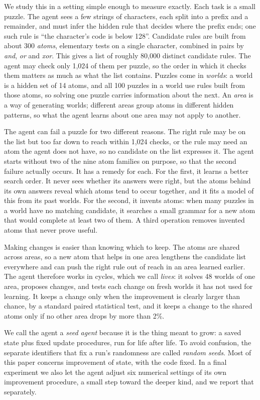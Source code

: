 \documentclass[11pt]{article}
\begin{document}
We study this in a setting simple enough to measure exactly. Each task is a small puzzle. The agent sees a few strings of characters, each split into a prefix and a remainder, and must infer the hidden rule that decides where the prefix ends; one such rule is ``the character's code is below 128''. Candidate rules are built from about 300 \emph{atoms}, elementary tests on a single character, combined in pairs by \emph{and}, \emph{or} and \emph{xor}. This gives a list of roughly 80,000 distinct candidate rules. The agent may check only 1,024 of them per puzzle, so the order in which it checks them matters as much as what the list contains. Puzzles come in \emph{worlds}: a world is a hidden set of 14 atoms, and all 100 puzzles in a world use rules built from those atoms, so solving one puzzle carries information about the next. An \emph{area} is a way of generating worlds; different areas group atoms in different hidden patterns, so what the agent learns about one area may not apply to another.

The agent can fail a puzzle for two different reasons. The right rule may be on the list but too far down to reach within 1,024 checks, or the rule may need an atom the agent does not have, so no candidate on the list expresses it. The agent starts without two of the nine atom families on purpose, so that the second failure actually occurs. It has a remedy for each. For the first, it learns a better search order. It never sees whether its answers were right, but the atoms behind its own answers reveal which atoms tend to occur together, and it fits a model of this from its past worlds. For the second, it invents atoms: when many puzzles in a world have no matching candidate, it searches a small grammar for a new atom that would complete at least two of them. A third operation removes invented atoms that never prove useful.

Making changes is easier than knowing which to keep. The atoms are shared across areas, so a new atom that helps in one area lengthens the candidate list everywhere and can push the right rule out of reach in an area learned earlier. The agent therefore works in cycles, which we call \emph{lives}: it solves 48 worlds of one area, proposes changes, and tests each change on fresh worlds it has not used for learning. It keeps a change only when the improvement is clearly larger than chance, by a standard paired statistical test, and it keeps a change to the shared atoms only if no other area drops by more than 2\%.

We call the agent a \emph{seed agent} because it is the thing meant to grow: a saved state plus fixed update procedures, run for life after life. To avoid confusion, the separate identifiers that fix a run's randomness are called \emph{random seeds}. Most of this paper concerns improvement of state, with the code fixed. In a final experiment we also let the agent adjust six numerical settings of its own improvement procedure, a small step toward the deeper kind, and we report that separately.
\end{document}
